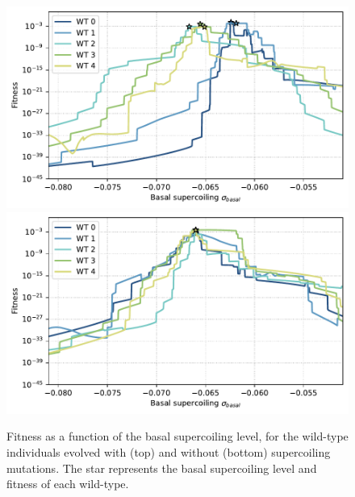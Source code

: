 \begin{figure}
\centering
\includegraphics[width=\textwidth]{epistasis/img/with-sc/fitness_landscapes_wt.pdf}
\includegraphics[width=\textwidth]{epistasis/img/control/fitness_landscapes_wt.pdf}
\caption[Supercoiling fitness landscapes for the wild-type individuals evolved with and without supercoiling mutations]{Fitness as a function of the basal supercoiling level, for the wild-type individuals evolved with (top) and without (bottom) supercoiling mutations.
The star represents the basal supercoiling level and fitness of each wild-type.}
\label{fig:epistasis:fitness-landscapes-wt}
\end{figure}

